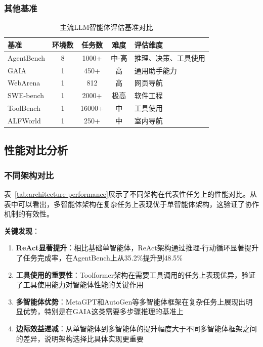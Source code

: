\subsubsection{其他基准}

\begin{table}[htbp]
    \centering
    \caption{主流LLM智能体评估基准对比}
    \label{tab:benchmarks}
    \begin{tabular}{@{}lcccp{4cm}@{}}
        \toprule
        \textbf{基准} & \textbf{环境数} & \textbf{任务数} & \textbf{难度} & \textbf{评估维度} \\
        \midrule
        AgentBench & 8 & 1000+ & 中-高 & 推理、决策、工具使用 \\
        GAIA & 1 & 450+ & 高 & 通用助手能力 \\
        WebArena & 1 & 812 & 高 & 网页导航 \\
        SWE-bench & 1 & 2000+ & 极高 & 软件工程 \\
        ToolBench & 1 & 16000+ & 中 & 工具使用 \\
        ALFWorld & 1 & 250+ & 中 & 室内导航 \\
        \bottomrule
    \end{tabular}
\end{table}

\subsection{性能对比分析}

\subsubsection{不同架构对比}

表~\ref{tab:architecture-performance}展示了不同架构在代表性任务上的性能对比。从表中可以看出，多智能体架构在复杂任务上表现优于单智能体架构，这验证了协作机制的有效性。

\textbf{关键发现}：
\begin{enumerate}[leftmargin=2em]
    \item \textbf{ReAct显著提升}：相比基础单智能体，ReAct架构通过推理-行动循环显著提升了任务完成率，在AgentBench上从35.2\%提升到48.5\%
    \item \textbf{工具使用的重要性}：Toolformer架构在需要工具调用的任务上表现优异，验证了工具使用能力对智能体性能的关键作用
    \item \textbf{多智能体优势}：MetaGPT和AutoGen等多智能体框架在复杂任务上展现出明显优势，特别是在GAIA这类需要多步骤推理的基准上
    \item \textbf{边际效益递减}：从单智能体到多智能体的提升幅度大于不同多智能体框架之间的差异，说明架构选择比具体实现更重要
\end{enumerate}

